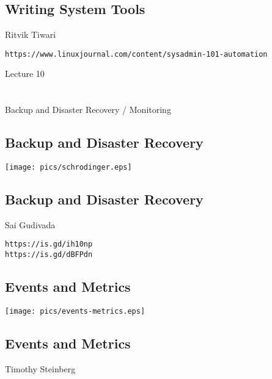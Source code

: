 \documentclass[xga]{xdvislides}
\begin{document}
\subsection{Writing System Tools}
Ritvik Tiwari\\
\vspace{1in}

\verb+https://www.linuxjournal.com/content/sysadmin-101-automation+

\newpage
\vspace*{\fill}
\begin{center}
    \Hugesize
        Lecture 10 \\ [1em]
    \hspace*{5mm}
    \blueline\\
    \hspace*{5mm}\\
	Backup and Disaster Recovery / Monitoring
\end{center}
\vspace*{\fill}

\subsection{Backup and Disaster Recovery}
\vspace*{\fill}
\begin{center}
	\texttt{[image: pics/schrodinger.eps]}
\end{center}
\vspace*{\fill}

\subsection{Backup and Disaster Recovery}
Sai Gudivada\\
\vspace{1in}

\verb+https://is.gd/ih10np+\\
\verb+https://is.gd/dBFPdn+

\subsection{Events and Metrics}
\begin{center}
	\texttt{[image: pics/events-metrics.eps]}
\end{center}

\subsection{Events and Metrics}
Timothy Steinberg\\
\vspace{1in}
\end{document}

